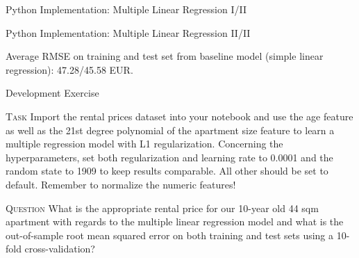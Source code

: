 \documentclass[main.tex]{subfiles}
\begin{document}
    \begin{frame}{Python Implementation: Multiple Linear Regression I/II}
        
    \end{frame}

    \begin{frame}{Python Implementation: Multiple Linear Regression II/II}
        
        Average RMSE on training and test set from baseline model (simple linear regression): 47.28/45.58 EUR.
    \end{frame}

    \begin{frame}{Development Exercise }
        \begin{alertblock}{\textsc{Task}}
            Import the rental prices dataset into your notebook and use the age feature as well as the 21st degree polynomial of the apartment size feature to learn a multiple regression model with L1 regularization. Concerning the hyperparameters, set both regularization and learning rate to 0.0001 and the random state to 1909 to keep results comparable. All other should be set to default. Remember to normalize the numeric features!
        \end{alertblock}
        \begin{alertblock}{\textsc{Question}}
            What is the appropriate rental price for our 10-year old 44 sqm apartment with regards to the multiple linear regression model and what is the out-of-sample root mean squared error on both training and test sets using a 10-fold cross-validation?
        \end{alertblock}
    \end{frame}
\end{document}

